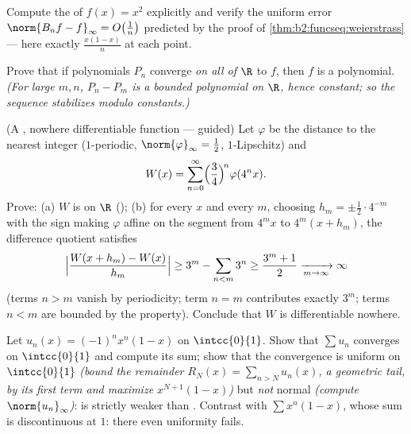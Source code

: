 \begin{exercise}[$\star\star$]\label{exo:b2:funcseq:7}
Compute the  of $f(x) = x^2$ explicitly and
verify the uniform error $\norm{B_n f - f}_\infty =
O\bigl(\frac1n\bigr)$ predicted by the proof of
\cref{thm:b2:funcseq:weierstrass} --- here exactly $\frac{x(1 -
x)}{n}$ at each point.
\end{exercise}

\begin{exercise}[$\star\star$]\label{exo:b2:funcseq:8}
Prove that if polynomials $P_n$ converge  \emph{on all of
$\R$} to $f$, then $f$ is a polynomial. \emph{(For large $m, n$,
$P_n - P_m$ is a bounded polynomial on $\R$, hence constant; so the
sequence stabilizes modulo constants.)}
\end{exercise}

\begin{exercise}[$\star\star\star$]\label{exo:b2:funcseq:9}
(A , nowhere differentiable function --- guided) Let
$\varphi$ be the distance to the nearest integer ($1$-periodic,
$\norm{\varphi}_\infty = \frac12$, $1$-Lipschitz) and
\[
W(x) = \sum_{n=0}^{\infty} \Bigl(\frac{3}{4}\Bigr)^{\!n}
\varphi(4^n x) .
\]
Prove: (a) $W$ is  on $\R$ (); (b) for
every $x$ and every $m$, choosing $h_m = \pm\frac12\cdot 4^{-m}$
with the sign making $\varphi$ affine on the segment from $4^m x$
to $4^m(x + h_m)$, the difference quotient satisfies
\[
\Bigl|\frac{W(x + h_m) - W(x)}{h_m}\Bigr| \geq 3^m -
\sum_{n<m} 3^n \geq \frac{3^m + 1}{2} \xrightarrow[m\to\infty]{}
\infty
\]
(terms $n > m$ vanish by periodicity; term $n = m$ contributes
exactly $3^m$; terms $n < m$ are bounded by the  property).
Conclude that $W$ is differentiable nowhere.
\end{exercise}

\begin{exercise}[$\star$]\label{exo:b2:funcseq:10}
Let $u_n(x) = (-1)^n x^n(1 - x)$ on $\intcc{0}{1}$. Show that
$\sum u_n$ converges  on $\intcc{0}{1}$ and compute its
sum; show that the convergence is uniform on $\intcc{0}{1}$
\emph{(bound the remainder $R_N(x) = \sum_{n > N} u_n(x)$, a
geometric tail, by its first term and maximize $x^{N+1}(1-x)$)}
but \emph{not} normal \emph{(compute $\norm{u_n}_\infty$)}:
 is strictly weaker than .
Contrast with $\sum x^n(1-x)$, whose sum is discontinuous at
$1$: there even uniformity fails.
\end{exercise}

